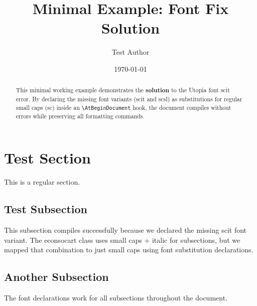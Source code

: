 \documentclass[qe]{econsocart}
\begin{document}
\title{Minimal Example: Font Fix Solution}
\author{Test Author}
\date{\today}
\maketitle

\begin{abstract}
  This minimal working example demonstrates the \textbf{solution} to the Utopia font scit error.
  By declaring the missing font variants (scit and scsl) as substitutions for regular small caps (sc)
  inside an \texttt{\textbackslash AtBeginDocument} hook, the document compiles without errors while
  preserving all formatting commands.
\end{abstract}

\section{Test Section}
This is a regular section.

\subsection{Test Subsection}
This subsection compiles successfully because we declared the missing scit font variant.
The econsocart class uses small caps + italic for subsections, but we mapped that
combination to just small caps using font substitution declarations.

\subsection{Another Subsection}
The font declarations work for all subsections throughout the document.
\end{document}
